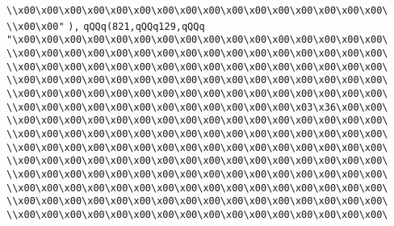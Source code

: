 \verb|\\x00\x00\x00\x00\x00\x00\x00\x00\x00\x00\x00\x00\x00\x00\x00\x00\|\newline
\verb|\\x00\x00"|\newline
\verb|),|\newline
\verb|qQQq(821,qQQq129,qQQq|\newline
\verb|"\x00\x00\x00\x00\x00\x00\x00\x00\x00\x00\x00\x00\x00\x00\x00\x00\|\newline
\verb|\\x00\x00\x00\x00\x00\x00\x00\x00\x00\x00\x00\x00\x00\x00\x00\x00\|\newline
\verb|\\x00\x00\x00\x00\x00\x00\x00\x00\x00\x00\x00\x00\x00\x00\x00\x00\|\newline
\verb|\\x00\x00\x00\x00\x00\x00\x00\x00\x00\x00\x00\x00\x00\x00\x00\x00\|\newline
\verb|\\x00\x00\x00\x00\x00\x00\x00\x00\x00\x00\x00\x00\x00\x00\x00\x00\|\newline
\verb|\\x00\x00\x00\x00\x00\x00\x00\x00\x00\x00\x00\x00\x03\x36\x00\x00\|\newline
\verb|\\x00\x00\x00\x00\x00\x00\x00\x00\x00\x00\x00\x00\x00\x00\x00\x00\|\newline
\verb|\\x00\x00\x00\x00\x00\x00\x00\x00\x00\x00\x00\x00\x00\x00\x00\x00\|\newline
\verb|\\x00\x00\x00\x00\x00\x00\x00\x00\x00\x00\x00\x00\x00\x00\x00\x00\|\newline
\verb|\\x00\x00\x00\x00\x00\x00\x00\x00\x00\x00\x00\x00\x00\x00\x00\x00\|\newline
\verb|\\x00\x00\x00\x00\x00\x00\x00\x00\x00\x00\x00\x00\x00\x00\x00\x00\|\newline
\verb|\\x00\x00\x00\x00\x00\x00\x00\x00\x00\x00\x00\x00\x00\x00\x00\x00\|\newline
\verb|\\x00\x00\x00\x00\x00\x00\x00\x00\x00\x00\x00\x00\x00\x00\x00\x00\|\newline
\verb|\\x00\x00\x00\x00\x00\x00\x00\x00\x00\x00\x00\x00\x00\x00\x00\x00\|\newline
